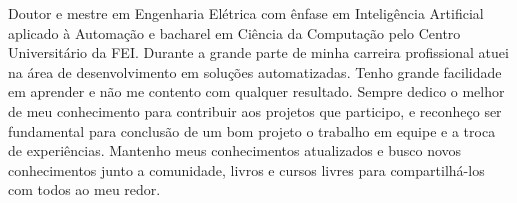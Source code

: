 

\begin{cvparagraph}

Doutor e mestre em Engenharia Elétrica com ênfase em Inteligência Artificial aplicado à Automação e bacharel em Ciência da Computação pelo Centro Universitário da FEI. Durante a grande parte de minha carreira profissional atuei na área de desenvolvimento em soluções automatizadas. Tenho grande facilidade em aprender e não me contento com qualquer resultado. Sempre dedico o melhor de meu conhecimento para contribuir aos projetos que participo, e reconheço ser fundamental para conclusão de um bom projeto o trabalho em equipe e a troca de experiências. Mantenho meus conhecimentos atualizados e busco novos conhecimentos junto a comunidade, livros e cursos livres para compartilhá-los com todos ao meu redor.
\end{cvparagraph}
